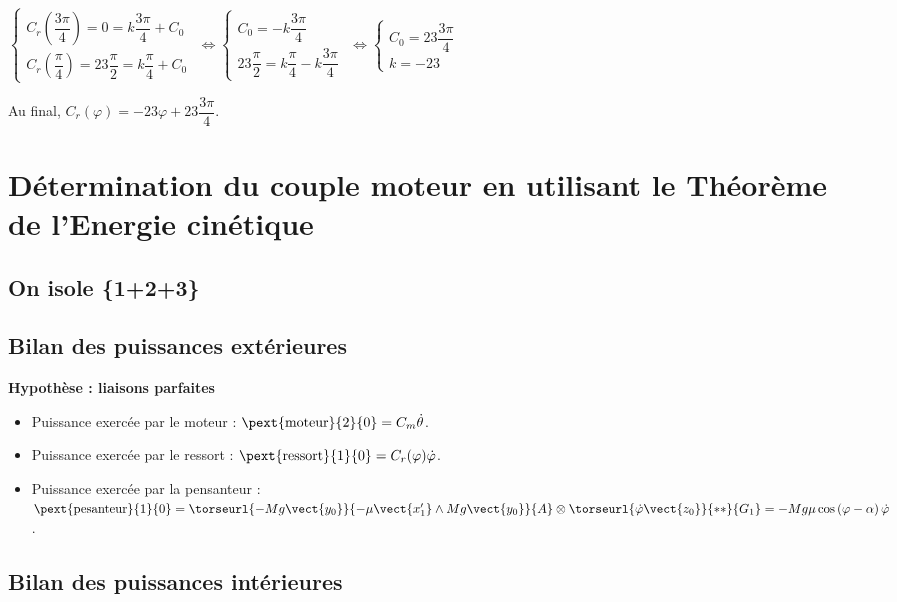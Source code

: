 $\left\{
\begin{array}{l}
C_r\left(\dfrac{3\pi}{4}\right) = 0 =  k\dfrac{3\pi}{4}+ C_0 \\
C_r\left(\dfrac{\pi}{4}\right) =23 \dfrac{\pi}{2}=  k\dfrac{\pi}{4}+ C_0 
\end{array}
\right.$
$ \Leftrightarrow \left\{
\begin{array}{l}
C_0 = - k\dfrac{3\pi}{4}  \\
23 \dfrac{\pi}{2}=  k\dfrac{\pi}{4}- k\dfrac{3\pi}{4} 
\end{array}
\right.$
$ \Leftrightarrow \left\{
\begin{array}{l}
C_0 = 23 \dfrac{3\pi}{4}  \\
k  = -23
\end{array}
\right.$

Au final, $C_r (\varphi) =-23\varphi + 23 \dfrac{3\pi}{4}$.


\section{Détermination du couple moteur en utilisant le Théorème de l'Energie cinétique}

\subsection{On isole \{1+2+3\}}

\subsection{Bilan des puissances extérieures}

\textbf{Hypothèse : liaisons parfaites}

\begin{itemize}
\item Puissance exercée par le moteur : $\pext{\text{moteur}}{2}{0} = C_m \dot{\theta}$.
\item Puissance exercée par le ressort : $\pext{\text{ressort}}{1}{0} = C_r(\varphi) \dot{\varphi}$.
\item Puissance exercée par la pensanteur : $\pext{\text{pesanteur}}{1}{0} = \torseurl{-Mg\vect{y_0}}{-\mu \vect{x_1'}\wedge Mg\vect{y_0}}{A} \otimes \torseurl{\dot{\varphi}\vect{z_0}}{**}{G_1} = -Mg\mu\cos\left(\varphi -\alpha\right)  \dot{\varphi}$.
\end{itemize}



\subsection{Bilan des puissances intérieures}

